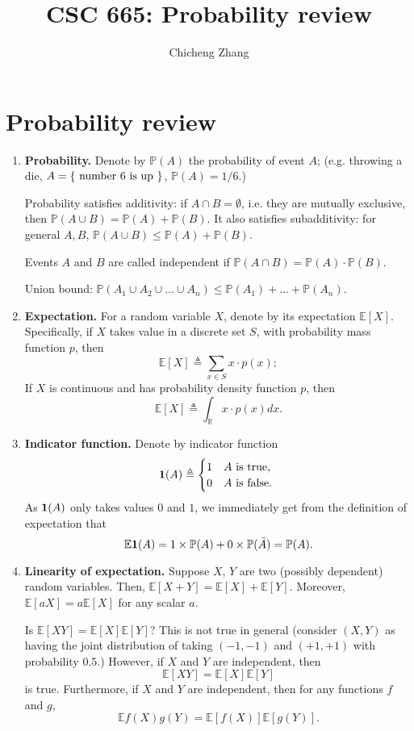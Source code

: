 \documentclass{article}
\title{CSC 665: Probability review}
\author{Chicheng Zhang}
\newcommand{\RR}{\mathbb{R}} %
\newcommand{\EE}{\mathbb{E}} %
\newcommand{\PP}{\mathbb{P}} %
\newcommand{\defeq}{\triangleq}
\newcommand*{\one}{{\bf 1}}
\begin{document}
\maketitle

\section{Probability review}

\begin{enumerate}
\item \textbf{Probability.} Denote by $\PP(A)$ the probability of event $A$; (e.g. throwing
a die, $A = \cbr{ \text{ number 6 is up } }$, $\PP(A) = 1/6$.)

Probability satisfies additivity: if $A \cap B = \emptyset$, i.e. they are mutually exclusive, then $\PP(A \cup B) = \PP(A) + \PP(B)$.
It also satisfies subadditivity: for general $A, B$, $\PP(A \cup B) \leq \PP(A) + \PP(B)$.

Events $A$ and $B$ are called independent if $\PP(A \cap B) = \PP(A) \cdot \PP(B)$.

Union bound: $\PP(A_1 \cup A_2 \cup \ldots \cup A_n) \leq \PP(A_1) + \ldots + \PP(A_n)$.

\item \textbf{Expectation.} For a random variable $X$, denote by its expectation $\EE[X]$. Specifically,
if $X$ takes value in a discrete set $S$, with probability mass function $p$, then
\[ \EE[X] \defeq \sum_{x \in S} x \cdot p(x); \]
If $X$ is continuous and has probability density function $p$, then
\[ \EE[X] \defeq \int_\RR x \cdot p(x) dx. \]

\item \textbf{Indicator function.} Denote by indicator function
\[
\one(A) \defeq \begin{cases} 1 & A \text{ is true, } \\ 0 & A \text{ is false. } \end{cases}
\]
As $\one(A)$ only takes values $0$ and $1$, we immediately get from the definition
of expectation that
\[ \EE \one(A) = 1 \times \PP(A) + 0 \times \PP(\bar{A}) = \PP(A). \]

\item \textbf{Linearity of expectation.} Suppose $X$, $Y$ are two (possibly dependent) random
variables. Then, $\EE[X + Y] = \EE[X] + \EE[Y]$.
Moreover, $\EE[a X] = a \EE[X]$ for any scalar $a$.

Is $\EE[X Y] = \EE[X] \EE[Y]$? This is not true in general (consider $(X,Y)$ as having the joint distribution of taking $(-1,-1)$ and $(+1,+1)$ with probability $0.5$.) However, if $X$ and $Y$ are independent, then
\[ \EE[X Y] = \EE[X] \EE[Y] \]
is true. Furthermore, if $X$ and $Y$ are independent, then for any functions $f$ and $g$,
\[ \EE f(X) g(Y) = \EE[f(X)] \EE[g(Y)]. \]


\end{enumerate}
\end{document}
